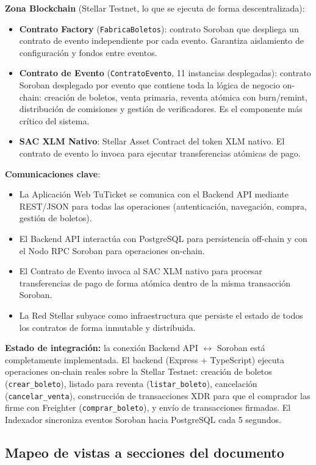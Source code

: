 \documentclass[12pt,oneside]{article}
\begin{document}
\textbf{Zona Blockchain} (Stellar Testnet, lo que se ejecuta de forma descentralizada):
\begin{itemize}
  \item \textbf{Contrato Factory} (\texttt{FabricaBoletos}): contrato Soroban que despliega un contrato de evento independiente por cada evento. Garantiza aislamiento de configuración y fondos entre eventos.
  \item \textbf{Contrato de Evento} (\texttt{ContratoEvento}, 11 instancias desplegadas): contrato Soroban desplegado por evento que contiene toda la lógica de negocio on-chain: creación de boletos, venta primaria, reventa atómica con burn/remint, distribución de comisiones y gestión de verificadores. Es el componente más crítico del sistema.
  \item \textbf{SAC XLM Nativo}: Stellar Asset Contract del token XLM nativo. El contrato de evento lo invoca para ejecutar transferencias atómicas de pago.
\end{itemize}

\textbf{Comunicaciones clave}:
\begin{itemize}
  \item La Aplicación Web TuTicket se comunica con el Backend API mediante REST/JSON para todas las operaciones (autenticación, navegación, compra, gestión de boletos).
  \item El Backend API interactúa con PostgreSQL para persistencia off-chain y con el Nodo RPC Soroban para operaciones on-chain.
  \item El Contrato de Evento invoca al SAC XLM nativo para procesar transferencias de pago de forma atómica dentro de la misma transacción Soroban.
  \item La Red Stellar subyace como infraestructura que persiste el estado de todos los contratos de forma inmutable y distribuida.
\end{itemize}

\textbf{Estado de integración:} la conexión Backend API $\leftrightarrow$ Soroban está completamente implementada. El backend (Express + TypeScript) ejecuta operaciones on-chain reales sobre la Stellar Testnet: creación de boletos (\texttt{crear\_boleto}), listado para reventa (\texttt{listar\_boleto}), cancelación (\texttt{cancelar\_venta}), construcción de transacciones XDR para que el comprador las firme con Freighter (\texttt{comprar\_boleto}), y envío de transacciones firmadas. El Indexador sincroniza eventos Soroban hacia PostgreSQL cada 5 segundos.

\subsection{Mapeo de vistas a secciones del documento}
\end{document}
